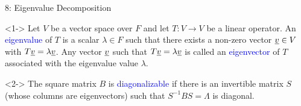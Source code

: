\documentclass[10pt,english,aspectratio=169]{beamer}
\begin{document}
\begin{frame}{8: Eigenvalue Decomposition}

\begin{definition}<1->
Let $V$ be a vector space over $F$ and let $T\colon V \to V$ be a linear operator.
An \textcolor{blue}{eigenvalue} of $T$ is a scalar $\lambda \in F$ such that there exists a non-zero vector $\underline{v} \in V$ with $T \underline{v} = \lambda \underline{v}$.
Any vector $\underline{v}$ such that $T \underline{v} = \lambda \underline{v}$ is called an \textcolor{blue}{eigenvector} of $T$ associated with the eigenvalue value $\lambda$.
\end{definition}

\begin{definition}<2->
The square matrix $B$ is \textcolor{blue}{diagonalizable} if there is an invertible matrix $S$ (whose columns are eigenvectors) such that $S^{-1} B S = \Lambda$ is diagonal.
\end{definition}




\end{frame}
\end{document}
